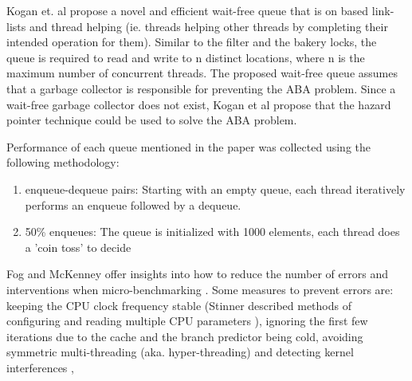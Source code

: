 \documentclass[a4paper, 12pt, titlepage]{article}
\begin{document}
\begin{onehalfspacing}
Kogan et. al propose a novel and efficient wait-free queue that is on based link-lists and thread helping (ie. threads helping other threads by completing their intended operation for them)\cite{kogan2011wait}. Similar to the filter and the bakery locks, the queue is required to read and write to n distinct locations, where n is the maximum number of concurrent threads\cite{herlihy2020art}.
The proposed wait-free queue assumes that a garbage collector is responsible for preventing the ABA problem. Since a wait-free garbage collector does not exist, Kogan et al propose that the hazard pointer technique could be used to solve the ABA problem.

Performance of each queue mentioned in the paper was collected using the following methodology:
\begin{enumerate}
  \item enqueue-dequeue pairs: Starting with an empty queue, each thread iteratively performs an enqueue followed by a dequeue.
  \item 50\% enqueues: The queue is initialized with 1000 elements, each thread does a 'coin toss' to decide
\end{enumerate}

Fog and McKenney offer insights into how to reduce the number of errors and interventions when micro-benchmarking \cite{fog1996optimizing,fog2020optimizing, mckenney2017parallel}. Some measures to prevent errors are: keeping the CPU clock frequency stable (Stinner described methods of configuring and reading multiple CPU parameters \cite{stinnerpstate}), ignoring the first few iterations due to the cache and the branch predictor being cold\cite{fog1996optimizing}, avoiding symmetric multi-threading (aka. hyper-threading) \cite{fog2020optimizing} and detecting kernel interferences \cite[Chapter~11.7]{mckenney2017parallel}, 



\end{onehalfspacing}
\end{document}
